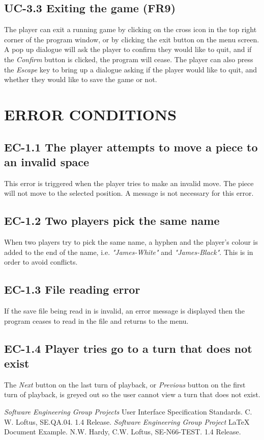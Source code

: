 \documentclass{project}
\begin{document}
\subsection{UC-3.3 Exiting the game (FR9)}
The player can exit a running game by clicking on the cross icon in the top right corner of the program window, or by clicking the exit button on the menu screen. A pop up dialogue will ask the player to confirm they would like to quit, and if the \emph{Confirm} button is clicked, the program will cease. The player can also press the \emph{Escape} key to bring up a dialogue asking if the player would like to quit, and whether they would like to save the game or not.
\section{ERROR CONDITIONS}
\subsection{EC-1.1 The player attempts to move a piece to an invalid space}
This error is triggered when the player tries to make an invalid move. The piece will not move to the selected position. A message is not necessary for this error.
\subsection{EC-1.2 Two players pick the same name}
When two players try to pick the same name, a hyphen and the player's colour is added to the end of the name, i.e. \emph{"James-White"} and \emph{"James-Black"}. This is in order to avoid conflicts.
\subsection{EC-1.3 File reading error}
If the save file being read in is invalid, an error message is displayed then the program ceases to read in the file and returns to the menu.
\subsection{EC-1.4 Player tries go to a turn that does not exist}
The \emph{Next} button on the last turn of playback, or \emph{Previous} button on the first turn of playback, is greyed out so the user cannot view a turn that does not exist.
\clearpage
{}
\begin{thebibliography}{5}
 \emph{Software Engineering Group Projects}
User Interface Specification Standards.
C. W. Loftus, SE.QA.04. 1.4 Release.
 \emph{Software Engineering Group Project}
LaTeX Document Example.
N.W. Hardy, C.W. Loftus, SE-N66-TEST. 1.4 Release.
\end{thebibliography}
\end{document}
